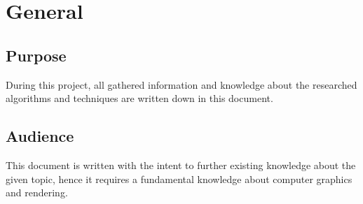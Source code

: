 \section{General}

\subsection{Purpose}
During this project, all gathered information and knowledge about the researched algorithms and techniques are written down in this document.

\subsection{Audience}
This document is written with the intent to further existing knowledge about the given topic, hence it requires a fundamental knowledge about computer graphics and rendering.

